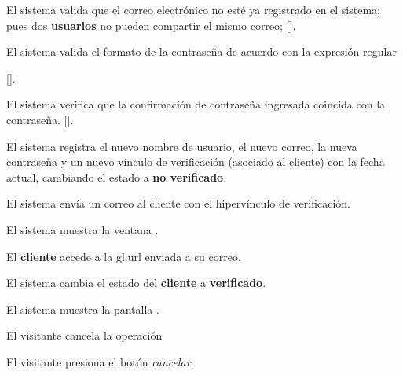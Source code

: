 {\begin{trayectoriaPrincipal}
    \item El sistema valida que el correo electrónico no esté ya
      registrado en el sistema; pues dos \textbf{usuarios} no pueden
      compartir el mismo correo;
      [].

    \item El sistema valida el formato de la contraseña de acuerdo con
      la expresión regular


      [].

    \item El sistema verifica que la confirmación de contraseña
      ingresada coincida con la contraseña.
      [].

    \item El sistema registra el nuevo nombre de usuario, el nuevo correo, la
      nueva contraseña y un nuevo vínculo de verificación (asociado al cliente)
      con la fecha actual, cambiando el estado a \textbf{no verificado}.

    \item El sistema envía un correo al cliente con el hipervínculo de
      verificación.

    \item El sistema muestra la ventana
      .

    \item El \textbf{cliente} accede a la \gls{gl:url} enviada a su
      correo.

    \item El sistema cambia el estado del \textbf{cliente} a
      \textbf{verificado}.

    \item El sistema muestra la pantalla .

  \end{trayectoriaPrincipal}


  \begin{trayectoriaAlternativa}
    {El visitante cancela la operación}

    \item El visitante presiona el botón \textit{cancelar}.


\end{trayectoriaAlternativa}}
